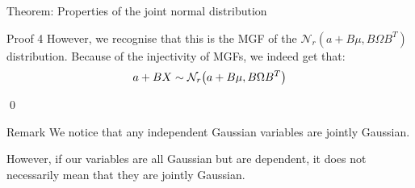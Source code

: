 \documentclass[a4paper]{article}
\begin{document}
\begin{parag}{Theorem: Properties of the joint normal distribution}
\begin{subparag}{Proof 4}
        However, we recognise that this is the MGF of the $\mathcal{N}_r\left(a + B \mu, B \Omega B^T\right)$ distribution. Because of the injectivity of MGFs, we indeed get that: 
        \[a + BX \followsdistr \mathcal{N}_r\left(a + B \mu, B \Omega B^T\right)\]

        \qed
    \end{subparag}
\end{parag}

\begin{parag}{Remark}
   We notice that any independent Gaussian variables are jointly Gaussian. 

   However, if our variables are all Gaussian but are dependent, it does not necessarily mean that they are jointly Gaussian.
\end{parag}
\end{document}
